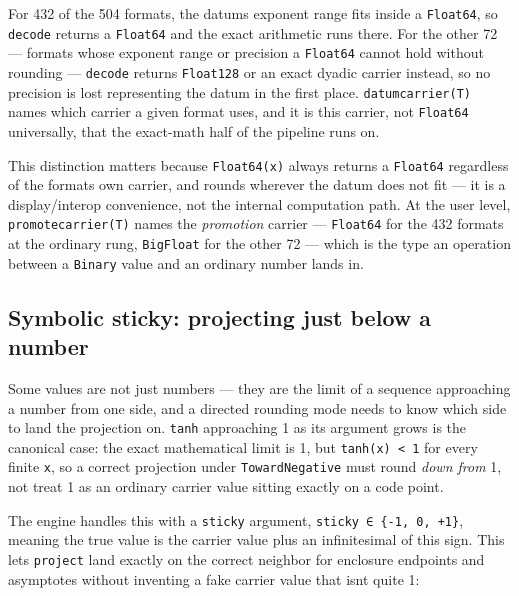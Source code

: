 For 432 of the 504 formats, the datum{\textquotesingle}s exponent range fits inside a \texttt{Float64}, so \texttt{decode} returns a \texttt{Float64} and the exact arithmetic runs there. For the other 72 — formats whose exponent range or precision a \texttt{Float64} cannot hold without rounding — \texttt{decode} returns \texttt{Float128} or an exact dyadic carrier instead, so no precision is lost representing the datum in the first place. \texttt{datumcarrier(T)} names which carrier a given format uses, and it is this carrier, not \texttt{Float64} universally, that the exact-math half of the pipeline runs on.



This distinction matters because \texttt{Float64(x)} always returns a \texttt{Float64} regardless of the format{\textquotesingle}s own carrier, and rounds wherever the datum does not fit — it is a display/interop convenience, not the internal computation path. At the user level, \texttt{promotecarrier(T)} names the \emph{promotion} carrier — \texttt{Float64} for the 432 formats at the ordinary rung, \texttt{BigFloat} for the other 72 — which is the type an operation between a \texttt{Binary} value and an ordinary number lands in.



\subsection{Symbolic sticky: projecting {\textquotedbl}just below{\textquotedbl} a number}



\label{1121493031502271068}{}


Some values are not just numbers — they are the limit of a sequence approaching a number from one side, and a directed rounding mode needs to know which side to land the projection on. \texttt{tanh} approaching 1 as its argument grows is the canonical case: the exact mathematical limit is 1, but \texttt{tanh(x) < 1} for every finite \texttt{x}, so a correct projection under \texttt{TowardNegative} must round \emph{down from} 1, not treat 1 as an ordinary carrier value sitting exactly on a code point.



The engine handles this with a \texttt{sticky} argument, \texttt{sticky ∈ \{-1, 0, +1\}}, meaning {\textquotedbl}the true value is the carrier value plus an infinitesimal of this sign.{\textquotedbl} This lets \texttt{project} land exactly on the correct neighbor for enclosure endpoints and asymptotes without inventing a fake carrier value that isn{\textquotesingle}t quite 1:




